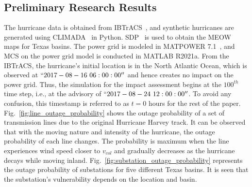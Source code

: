 \subsection{Preliminary Research Results}
The hurricane data is obtained from IBTrACS~\cite{Knapp2010}, and synthetic hurricanes are generated using CLIMADA~\cite{Climada} in Python. SDP~\cite{SDP} is used to obtain the MEOW maps for Texas basins. The power grid is modeled in MATPOWER 7.1~\cite{5491276}, and MCS on the power grid model is conducted in MATLAB R2021a.  
From the IBTrACS, the hurricane's initial location is in the North Atlantic Ocean, which is observed at $``2017-08-16~06:00:00''$ and hence creates no impact on the power grid. Thus, the simulation for the impact assessment begins at the $100^{th}$ time step, i.e., at the advisory of $``2017-08-24~12:00:00''$. To avoid any confusion, this timestamp is referred to as $t=0$ hours for the rest of the paper. Fig.~\ref{fig:line_outage_probability} shows the outage probability of a set of transmission lines due to the original Hurricane Harvey track. It can be observed that with the moving nature and intensity of the hurricane, the outage probability of each line changes. The probability is maximum when the line experiences wind speed closer to $v_{col}$ and gradually decreases as the hurricane decays while moving inland. Fig.~\ref{fig:substation_outage_probability} represents the outage probability of substations for five different Texas basins. It is seen that the substation's vulnerability depends on the location and basin.

